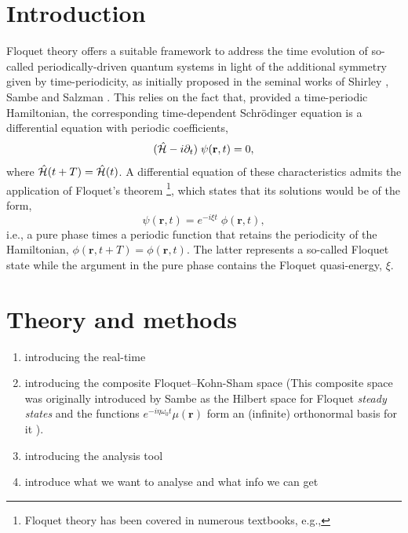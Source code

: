 \documentclass[aps,physrev,preprint,groupedaddress]{revtex4-2}
\newcommand{\fff}[1]{#1}
\renewcommand{\[}{\left[}
\renewcommand{\]}{\right]}
\renewcommand{\(}{\left(}
\renewcommand{\)}{\right)}
\begin{document}
\section{Introduction}
Floquet theory offers a suitable framework to address the time evolution of so-called periodically-driven quantum systems in light of the additional symmetry given by time-periodicity, as initially proposed in the seminal works of Shirley \cite{Shirley1965}, Sambe \cite{Sambe1973} and Salzman \cite{Salzman1973}. This relies on the fact that, provided a time-periodic Hamiltonian, the corresponding time-dependent Schr\"odinger equation is a differential equation with periodic coefficients,
\begin{equation}\label{eq:2-Floquet_1}
    (\hat{\cal H} - i \partial_t)\;\psi(\mathbf{r},t) = 0,
\end{equation}
where $\hat{\cal H}(t+T)=\hat{\cal H}(t)$. A differential equation of these characteristics admits the application of Floquet's theorem \cite{Floquet1883}
\footnote{Floquet theory has been covered in numerous textbooks, e.g.,\cite{tannor2007,joachain2011}}, which states that its solutions would be of the form,
\begin{equation}\label{eq:2-Floquet_2}
    \psi(\mathbf{r},t) = e^{-i\xi t}\; \phi(\mathbf{r},t),
\end{equation}
i.e., a pure phase times a periodic function that retains the periodicity of the Hamiltonian, $\phi(\mathbf{r},t+T)=\phi(\mathbf{r},t)$. The latter represents a so-called Floquet state while the argument in the pure phase contains the Floquet quasi-energy, $\xi$. 

\section{\label{sec:theo} Theory and methods}
\begin{enumerate}
    \item introducing the real-time
    \item introducing the composite Floquet--Kohn-Sham space (This composite space was originally introduced by Sambe as the Hilbert space for Floquet \textit{steady states} and the functions $e^{-i\fff{\eta\omega_0} t}\mu(\mathbf{r})$ form an (infinite) orthonormal basis for it \cite{Sambe1973}). 
    \item introducing the analysis tool
    \item introduce what we want to analyse and what info we can get
\end{enumerate}
\end{document}
